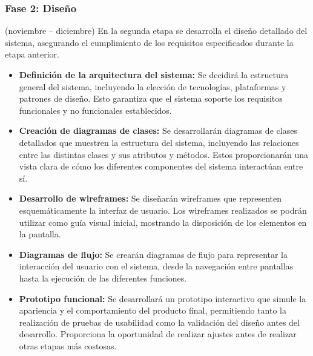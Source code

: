 \subsubsection{Fase 2: Diseño} (noviembre – diciembre)
En la segunda etapa se desarrolla el diseño detallado del sistema, asegurando el cumplimiento de los requisitos especificados durante la etapa anterior.
\begin{itemize}
    \item \textbf{Definición de la arquitectura del sistema:} Se decidirá la estructura general del sistema, incluyendo la elección de tecnologías, plataformas y patrones de diseño. Esto garantiza que el sistema soporte los requisitos funcionales y no funcionales establecidos.
    \item \textbf{Creación de diagramas de clases:} Se desarrollarán diagramas de clases detallados que muestren la estructura del sistema, incluyendo las relaciones entre las distintas clases y sus atributos y métodos. Estos proporcionarán una vista clara de cómo los diferentes componentes del sistema interactúan entre sí.
    \item \textbf{Desarrollo de wireframes:} Se diseñarán wireframes que representen esquemáticamente la interfaz de usuario. Los wireframes realizados se podrán utilizar como guía visual inicial, mostrando la disposición de los elementos en la pantalla.
    \item \textbf{Diagramas de flujo:} Se crearán diagramas de flujo para representar la interacción del usuario con el sistema, desde la navegación entre pantallas hasta la ejecución de las diferentes funciones. 
    \item \textbf{Prototipo funcional:} Se desarrollará un prototipo interactivo que simule la apariencia y el comportamiento del producto final, permitiendo tanto la realización de pruebas de usabilidad como la validación del diseño antes del desarrollo. Proporciona la oportunidad de realizar ajustes antes de realizar otras etapas más costosas.
\end{itemize}

